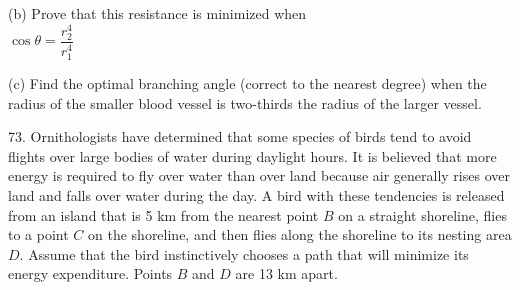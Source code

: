\documentclass{sebase}
\begin{document}
\begin{multicols}{2}
\begin{ExerciseList}
\begin{ExerciseList}
%

\item[(b)] Prove that this resistance is minimized when\\[6pt]
\hspace*{\fill}$\cos \theta =\dfrac{r_{2}^{4}}{r_{1}^{4}}$\hspace*{\fill}

%

\item[(c)] Find the optimal branching angle (correct to the nearest degree)
when the radius of the smaller blood vessel is two-thirds the radius of the
larger vessel.

%
\vspace*{6pt}
\end{ExerciseList}

\hspace*{\fill}\hspace*{\fill}

\item[\hfill 73.] Ornithologists have determined that some species of birds
tend to avoid flights over large bodies of water during daylight hours. It
is believed that more energy is required to fly over water than over land
because air generally rises over land and falls over water during the day. A
bird with these tendencies is released from an island that is 5 km from the
nearest point $B$ on a straight shoreline, flies to a point $C$ on the
shoreline, and then flies along the shoreline to its nesting area $D$.
Assume that the bird instinctively chooses a path that will minimize its
energy expenditure. Points $B$ and $D$ are 13 km apart.


\end{ExerciseList}
\end{multicols}
\end{document}
